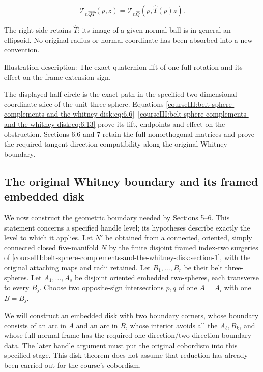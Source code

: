 \begin{equation}
\mathcal T_{n\widehat Q\widehat T}(p,z)
 =\mathcal T_{n\widehat Q}(p,\widehat T(p)z).
\label{courseIII:belt-sphere-complements-and-the-whitney-disk:eq:6.22}
\end{equation}

The right side retains \(\widehat T\); its image of a given normal ball is in general an ellipsoid. No original radius or normal coordinate has been absorbed into a new convention.

\label{courseIII:belt-sphere-complements-and-the-whitney-disk:normal-frame-diagram}
Illustration description: The exact quaternion lift of one full rotation and its effect on the frame-extension sign.

The displayed half-circle is the exact path in the specified two-dimensional coordinate slice of the unit three-sphere. Equations \eqref{courseIII:belt-sphere-complements-and-the-whitney-disk:eq:6.6}--\eqref{courseIII:belt-sphere-complements-and-the-whitney-disk:eq:6.13} prove its lift, endpoints and effect on the obstruction. Sections 6.6 and 7 retain the full nonorthogonal matrices and prove the required tangent-direction compatibility along the original Whitney boundary.

\subsection{The original Whitney boundary and its framed embedded disk}
\label{courseIII:belt-sphere-complements-and-the-whitney-disk:whitney-boundary}

\label{courseIII:belt-sphere-complements-and-the-whitney-disk:section-7}\label{courseIII:belt-complement:7}

We now construct the geometric boundary needed by Sections 5--6. This statement concerns a specified handle level; its hypotheses describe exactly the level to which it applies. Let \(N'\) be obtained from a connected, oriented, simply connected closed five-manifold \(N\) by the finite disjoint framed index-two surgeries of \cref{courseIII:belt-sphere-complements-and-the-whitney-disk:section-1}, with the original attaching maps and radii retained. Let \(B_1,\ldots,B_r\) be their belt three-spheres. Let \(A_1,\ldots,A_s\) be disjoint oriented embedded two-spheres, each transverse to every \(B_j\). Choose two opposite-sign intersections \(p,q\) of one \(A=A_i\) with one \(B=B_j\).

We will construct an embedded disk with two boundary corners, whose boundary consists of an arc in \(A\) and an arc in \(B\), whose interior avoids all the \(A_\ell,B_k\), and whose full normal frame has the required one-direction/two-direction boundary data. The later handle argument must put the original cobordism into this specified stage. This disk theorem does not assume that reduction has already been carried out for the course's cobordism.


